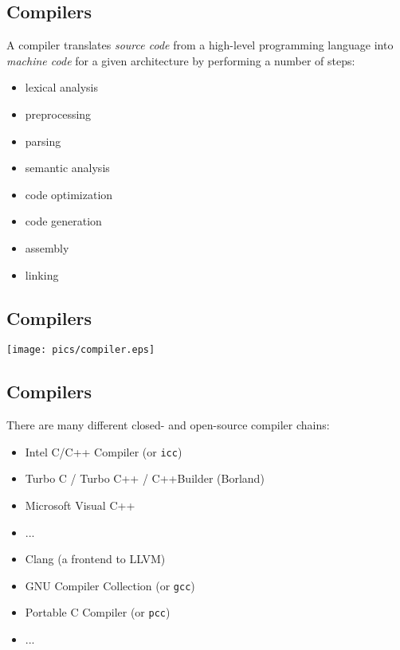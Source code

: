 \documentclass[xga]{xdvislides}
\begin{document}
%
%

\subsection{Compilers}

A compiler translates {\em source code} from a high-level programming
language into {\em machine code} for a given architecture by performing a
number of steps:

\begin{itemize}
	\item lexical analysis
	\item preprocessing
	\item parsing
	\item semantic analysis
	\item code optimization
	\item code generation
	\item assembly
	\item linking
\end{itemize}

\subsection{Compilers}

\begin{center}
	\texttt{[image: pics/compiler.eps]}
\end{center}


\subsection{Compilers}

There are many different closed- and open-source compiler chains:

\begin{itemize}
	\item Intel C/C++ Compiler (or \verb+icc+)
	\item Turbo C / Turbo C++ / C++Builder (Borland)
	\item Microsoft Visual C++
	\item ...
\\

	\item Clang (a frontend to LLVM)
	\item GNU Compiler Collection (or \verb+gcc+)
	\item Portable C Compiler (or \verb+pcc+)
	\item ...
\end{itemize}
\end{document}
